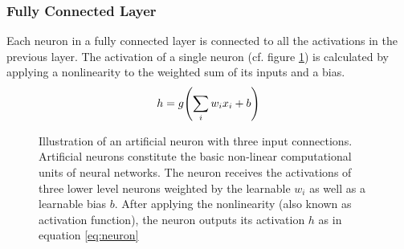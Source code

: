 \subsubsection{Fully Connected Layer}
Each neuron in a fully connected layer is connected to all the activations in the previous layer. The activation of a single neuron (cf. figure \ref{fig:neuron}) is calculated by applying a nonlinearity to the weighted sum of its inputs and a bias.
\begin{align}
    h = g\qty(\sum_i w_i x_i +b)
    \label{eq:neuron}
\end{align}
\begin{figure}
    \centering
{}
\caption[Illustration of an artificial neuron with three input connections]{Illustration of an artificial neuron with three input connections. Artificial neurons constitute the basic non-linear computational units of neural networks. The neuron receives the activations of three lower level neurons weighted by the learnable $w_i$ as well as a learnable bias $b$. After applying the nonlinearity (also known as activation function), the neuron outputs its activation $h$ as in equation  \ref{eq:neuron}}\label{fig:neuron}
\end{figure}\noindent
